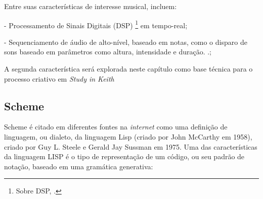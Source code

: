 Entre suas características de interesse musical, incluem:

- Processamento de Sinais Digitais (DSP) \footnote{Sobre DSP, .} em  tempo-real;

- Sequenciamento de áudio de alto-nível, baseado em notas, como o disparo de sons baseado em parâmetros como altura, intensidade e duração. .;

A segunda característica será explorada neste capítulo como base técnica para o processo criativo em \emph{Study in Keith}

\subsection{Scheme}\label{sec:scheme}

Scheme é citado em diferentes fontes na \emph{internet} como uma definição de linguagem, ou dialeto, da linguagem Lisp (criado por John McCarthy em 1958), criado por Guy L. Steele e Gerald Jay Sussman em 1975. Uma das características da linguagem LISP é o tipo de representação de um código, ou seu padrão de notação, baseado em uma gramática generativa:

